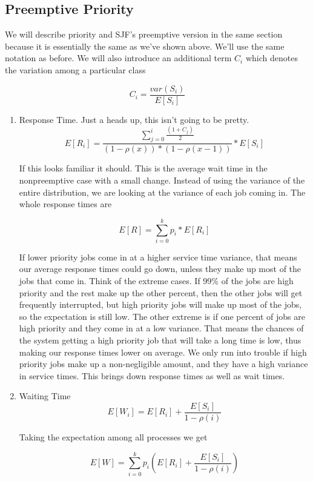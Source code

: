 \subsection{Preemptive Priority}

We will describe priority and SJF's preemptive version in the same section because it is essentially the same as we've shown above.
We'll use the same notation as before.
We will also introduce an additional term $C_i$ which denotes the variation among a particular class

\[
    C_i = \frac{var(S_i)}{E[S_i]}
\]

\begin{enumerate}
\item Response Time. Just a heads up, this isn't going to be pretty.
  \[
  E[R_i] = \frac{\sum\limits_{j=0}^i\frac{(1 + C_j)}{2}}{(1 - \rho(x))*( 1 - \rho(x-1))} * E[S_i]
  \]

  If this looks familiar it should.
  This is the average wait time in the nonpreemptive case with a small change. Instead of using the variance of the entire distribution, we are looking at the variance of each job coming in.
  The whole response times are

  \[
     E[R] = \sum\limits_{i = 0}^k p_i * E[R_i]
  \]

  If lower priority jobs come in at a higher service time variance, that means our average response times could go down, unless they make up most of the jobs that come in.
  Think of the extreme cases.
  If 99\% of the jobs are high priority and the rest make up the other percent, then the other jobs will get frequently interrupted, but high priority jobs will make up most of the jobs, so the expectation is still low.
  The other extreme is if one percent of jobs are high priority and they come in at a low variance.
  That means the chances of the system getting a high priority job that will take a long time is low, thus making our response times lower on average.
  We only run into trouble if high priority jobs make up a non-negligible amount, and they have a high variance in service times.
  This brings down response times as well as wait times.

\item Waiting Time
  \[
  E[W_i] = E[R_i] + \frac{E[S_i]}{1 - \rho(i)}
  \]

  Taking the expectation among all processes we get

  \[
  E[W] = \sum\limits_{i = 0}^k p_i (E[R_i] + \frac{E[S_i]}{1 - \rho(i)})
  \]


\end{enumerate}
